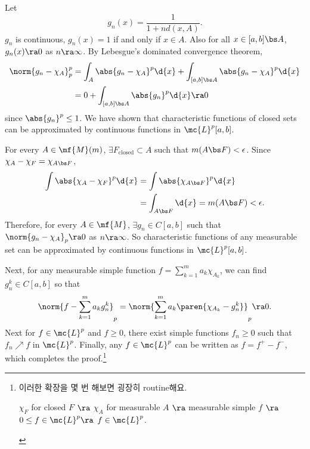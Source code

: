 Let
\[
    g_n(x) = \frac{1}{1 + n d(x, A)}.
\]
\(g_n\) is continuous, \(g_n(x) = 1\) if and only if \(x \in A\). Also for all \(x \in [a, b] \bs A\), \(g_n(x) \ra 0\) as \(n \ra \infty\). By Lebesgue's dominated convergence theorem,
\[
    \begin{aligned}
        \norm{g_n - \chi_A}_p^p & = \int_A \abs{g_n - \chi_A}^p \d{x} + \int_{[a, b]\bs A} \abs{g_n - \chi_A}^p \d{x} \\
                                & = 0 + \int_{[a, b]\bs A} \abs{g_n}^p \d{x} \ra 0
    \end{aligned}
\]
since \(\abs{g_n}^p \leq 1\). We have shown that characteristic functions of closed sets can be approximated by continuous functions in \(\mc{L}^{p}[a, b]\).

For every \(A \in \mf{M}(m)\), \(\exists F_\text{closed} \subset A\) such that \(m(A \bs F) < \epsilon\). Since \(\chi_A - \chi_F = \chi_{A \bs F}\),
\[
    \begin{aligned}
        \int \abs{\chi_A-\chi_F}^p \d{x} & = \int \abs{\chi_{A\bs F}}^p \d{x}             \\
                                         & = \int_{A\bs F} \d{x} = m(A \bs F) < \epsilon.
    \end{aligned}
\]
Therefore, for every \(A \in \mf{M}\), \(\exists g_n \in C[a, b]\) such that \(\norm{g_n - \chi_A}_p \ra 0\) as \(n \ra \infty\). So characteristic functions of any measurable set can be approximated by continuous functions in \(\mc{L}^{p}[a, b]\).

Next, for any measurable simple function \(f = \sum_{k=1}^{m}a_k \chi_{A_k}\), we can find \(g_n^k \in C[a, b]\) so that
\[
    \norm{f - \sum_{k=1}^{m} a_k g_n^k}_p = \norm{\sum_{k=1}^{m}a_k \paren{\chi_{A_k} - g_n^k}}_p \ra 0.
\]
Next for \(f \in \mc{L}^{p}\) and \(f \geq 0\), there exist simple functions \(f_n \geq 0\) such that \(f_n \nearrow f\) in \(\mc{L}^{p}\). Finally, any \(f \in \mc{L}^{p}\) can be written as \(f = f^+ - f^-\), which completes the proof.\footnote{이러한 확장을 몇 번 해보면 굉장히 routine해요.
    \begin{center}
        \(\chi_F\) for closed \(F\) \(\ra\) \(\chi_A\) for measurable \(A\) \(\ra\) measurable simple \(f\) \(\ra\) \(0\leq f \in \mc{L}^{p} \ra\) \(f \in \mc{L}^{p}\).
    \end{center}}
\pagebreak
